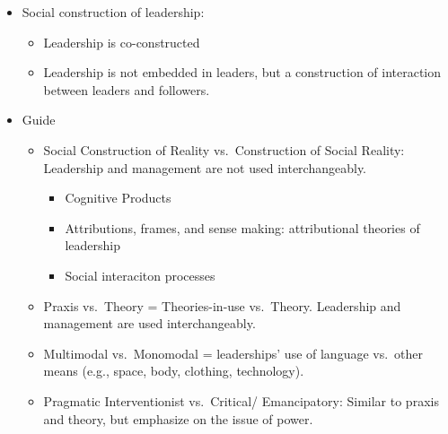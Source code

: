 \documentclass[
]{book}
\begin{document}
\citep{Fairhurst_2010}

\begin{itemize}
\item
  Social construction of leadership:

  \begin{itemize}
  \item
    Leadership is co-constructed
  \item
    Leadership is not embedded in leaders, but a construction of interaction between leaders and followers.
  \end{itemize}
\item
  Guide

  \begin{itemize}
  \item
    Social Construction of Reality vs.~Construction of Social Reality: Leadership and management are not used interchangeably.

    \begin{itemize}
    \item
      Cognitive Products
    \item
      Attributions, frames, and sense making: attributional theories of leadership
    \item
      Social interaciton processes
    \end{itemize}
  \item
    Praxis vs.~Theory = Theories-in-use vs.~Theory. Leadership and management are used interchangeably.
  \item
    Multimodal vs.~Monomodal = leaderships' use of language vs.~other means (e.g., space, body, clothing, technology).
  \item
    Pragmatic Interventionist vs.~Critical/ Emancipatory: Similar to praxis and theory, but emphasize on the issue of power.
  \end{itemize}
\end{itemize}

\citep{Hall_2010}
\end{document}
